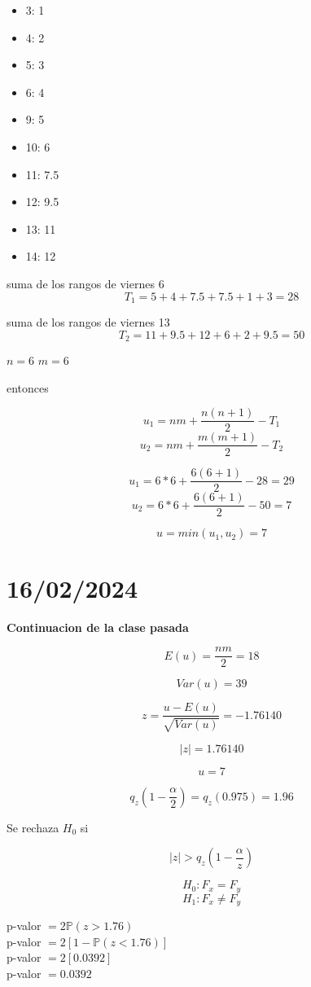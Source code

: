 \documentclass{article}
\begin{document}
\begin{itemize}
    \item 3: 1
    \item 4: 2
    \item 5: 3
    \item 6: 4
    \item 9: 5
    \item 10: 6
    \item 11: 7.5
    \item 12: 9.5
    \item 13: 11
    \item 14: 12
\end{itemize}

suma de los rangos de viernes 6
\[T_1 = 5 + 4 + 7.5 + 7.5 + 1 + 3 = 28\]

suma de los rangos de viernes 13
\[T_2 = 11 + 9.5 + 12 + 6 + 2 + 9.5 = 50\]

$n=6$
$m=6$

entonces

\[u_1 = nm + \frac{n(n+1)}{2} - T_1\]
\[u_2 = nm + \frac{m(m+1)}{2} - T_2\]

\vspace{.25cm}

\[u_1 = 6*6 + \frac{6(6+1)}{2} - 28 = 29\]
\[u_2 = 6*6 + \frac{6(6+1)}{2} - 50 = 7\]


\[u = min(u_1, u_2) = 7\]

\section{16/02/2024}

\textbf{Continuacion de la clase pasada}

\[E(u) = \frac{nm}{2} =18\]

\[Var(u) = 39\]

\[z = \frac{u - E(u)}{\sqrt{Var(u)}} = -1.76140\]

\[|z| = 1.76140\]

\[u = 7\]

\[q_z(1 - \frac{\alpha}{2}) = q_z(0.975) = 1.96\]

Se rechaza $H_0$ si

\[|z| > q_z(1-\frac{\alpha}{z})\]


\[H_0: F_x = F_y\]
\[H_1: F_x \neq F_y\]

p-valor $ = 2 \mathbb{P}(z > 1.76)$ \\
p-valor $ = 2 [1-\mathbb{P}(z < 1.76)]$ \\
p-valor $ = 2 [0.0392]$ \\
p-valor $ = 0.0392$
\end{document}
